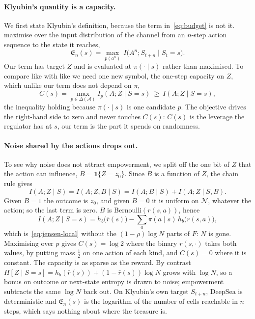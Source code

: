 \documentclass[11pt]{article}
\theoremstyle{remark}
\newcommand{\Acal}{\mathcal A}
\newcommand{\Ncal}{\mathcal N}
\newcommand{\1}{\mathds{1}}
\newcommand{\Hf}[1]{H\!\left[#1\right]}
\begin{document}
\paragraph{Klyubin's quantity is a capacity.}
We first state Klyubin's definition, because the term in~\eqref{eq:budget} is not it.
\citet{Klyubin-empowerment05} maximise over the input distribution of the channel from an $n$-step action sequence to the state it reaches,
\begin{equation}
  \mathfrak E_n(s)=\max_{p(a^n)}\,I\big(A^n;S_{t+n}\mid S_t=s\big).
  \label{eq:klyubin}
\end{equation}
Our term has target $Z$ and is evaluated at $\pi(\cdot\mid s)$ rather than maximised.
To compare like with like we need one new symbol, the one-step capacity on $Z$, which unlike our term does not depend on $\pi$,
\begin{equation}
  C(s)=\max_{p\in\Delta(\Acal)} I_p(A;Z\mid S=s)\ \ge\ I(A;Z\mid S=s),
  \label{eq:capacity}
\end{equation}
the inequality holding because $\pi(\cdot\mid s)$ is one candidate $p$.
The objective drives the right-hand side to zero and never touches $C(s)$: $C(s)$ is the leverage the regulator has at $s$, our term is the part it spends on randomness.

\paragraph{Noise shared by the actions drops out.}
To see why noise does not attract empowerment, we split off the one bit of $Z$ that the action can influence, $B=\1\{Z=z_0\}$.
Since $B$ is a function of $Z$, the chain rule gives
\begin{equation}
  I(A;Z\mid S)=I(A;Z,B\mid S)=I(A;B\mid S)+I(A;Z\mid S,B).
\end{equation}
Given $B=1$ the outcome is $z_0$, and given $B=0$ it is uniform on $\Ncal$, whatever the action; so the last term is zero.
$B$ is Bernoulli$(r(s,a))$, hence
\begin{equation}
  I(A;Z\mid S=s)=h_b\big(\bar r(s)\big)-\sum_a\pi(a\mid s)\,h_b\big(r(s,a)\big),
  \label{eq:emp-binary-general}
\end{equation}
which is~\eqref{eq:jensen-local} without the $(1-\rho)\log N$ parts of $F$: $N$ is gone.
Maximising over $p$ gives $C(s)=\log2$ where the binary $r(s,\cdot)$ takes both values, by putting mass $\tfrac12$ on one action of each kind, and $C(s)=0$ where it is constant.
The capacity is as sparse as the reward.
By contrast $\Hf{Z\mid S=s}=h_b(\bar r(s))+(1-\bar r(s))\log N$ grows with $\log N$, so a bonus on outcome or next-state entropy is drawn to noise; empowerment subtracts the same $\log N$ back out.
On Klyubin's own target $S_{t+n}$, DeepSea is deterministic and $\mathfrak E_n(s)$ is the logarithm of the number of cells reachable in $n$ steps, which says nothing about where the treasure is.
\end{document}
